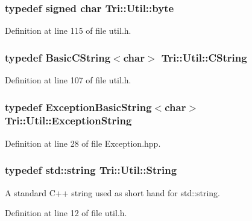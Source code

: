 \subsubsection[{byte}]{\setlength{\rightskip}{0pt plus 5cm}typedef signed char {\bf Tri\+::\+Util\+::byte}}\label{namespace_tri_1_1_util_ac0ce128644ac42b2ffe7a0657e4d47d4}


Definition at line 115 of file util.\+h.

\hypertarget{namespace_tri_1_1_util_a230e3165303297a479e415ab83b18b8c}{}
\subsubsection[{C\+String}]{\setlength{\rightskip}{0pt plus 5cm}typedef {\bf Basic\+C\+String}$<$char$>$ {\bf Tri\+::\+Util\+::\+C\+String}}\label{namespace_tri_1_1_util_a230e3165303297a479e415ab83b18b8c}


Definition at line 107 of file util.\+h.

\hypertarget{namespace_tri_1_1_util_ac7d0a48237beb68f23ba39a6ad03b4bc}{}
\subsubsection[{Exception\+String}]{\setlength{\rightskip}{0pt plus 5cm}typedef {\bf Exception\+Basic\+String}$<$char$>$ {\bf Tri\+::\+Util\+::\+Exception\+String}}\label{namespace_tri_1_1_util_ac7d0a48237beb68f23ba39a6ad03b4bc}


Definition at line 28 of file Exception.\+hpp.

\hypertarget{namespace_tri_1_1_util_af46507fc04f64a834bf12b8fdf4dde37}{}
\subsubsection[{String}]{\setlength{\rightskip}{0pt plus 5cm}typedef std\+::string {\bf Tri\+::\+Util\+::\+String}}\label{namespace_tri_1_1_util_af46507fc04f64a834bf12b8fdf4dde37}


A standard C++ string used as short hand for std\+::string. 



Definition at line 12 of file util.\+h.

